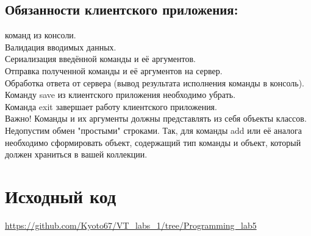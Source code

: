 \subsection{Обязанности клиентского приложения:}

 команд из консоли.\\
Валидация вводимых данных.\\
Сериализация введённой команды и её аргументов.\\
Отправка полученной команды и её аргументов на сервер.\\
Обработка ответа от сервера (вывод результата исполнения команды в консоль).\\
Команду save из клиентского приложения необходимо убрать.\\
Команда exit завершает работу клиентского приложения.\\
Важно! Команды и их аргументы должны представлять из себя объекты классов. Недопустим обмен "простыми" строками. Так, для команды add или её аналога необходимо сформировать объект, содержащий тип команды и объект, который должен храниться в вашей коллекции.

\section{Исходный код}
\url{https://github.com/Kyoto67/VT_labs_1/tree/Programming_lab5}